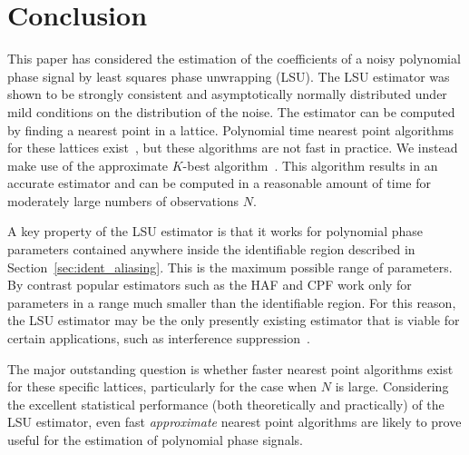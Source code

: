 \documentclass[journal]{IEEEtran}
\begin{document}
\section{Conclusion} \label{sec:conclusion}
 
This paper has considered the estimation of the coefficients of a noisy polynomial phase signal by least squares phase unwrapping (LSU). The LSU estimator was shown to be strongly consistent and asymptotically normally distributed under mild conditions on the distribution of the noise.  The estimator can be computed by finding a nearest point in a lattice. Polynomial time nearest point algorithms for these lattices exist~\cite[Sec 4.3]{McKilliam2010thesis}, but these algorithms are not fast in practice.  We instead make use of the approximate $K$-best algorithm~\cite{Baro_list_sphere_dec_2003,Zhan2006_K_best_sphere_decoder,Mondal_Kbest_again_2009}.  This algorithm results in an accurate estimator and can be computed in a reasonable amount of time for moderately large numbers of observations $N$. 

A key property of the LSU estimator is that it works for polynomial phase parameters contained anywhere inside the identifiable region described in Section~\ref{sec:ident_aliasing}.  This is the maximum possible range of parameters.  By contrast popular estimators such as the HAF and CPF work only for parameters in a range much smaller than the identifiable region.  For this reason, the LSU estimator may be the only presently existing estimator that is viable for certain applications, such as interference suppression~\cite{Djukanovic:2011:PMN:1950994.1951252,Djurovic_aliasing_2012}. 

The major outstanding question is whether faster nearest point algorithms exist for these specific lattices, particularly for the case when $N$ is large.  Considering the excellent statistical performance (both theoretically and practically) of the LSU estimator, even fast \emph{approximate} nearest point algorithms are likely to prove useful for the estimation of polynomial phase signals. 

\nocite{OShea_refiningpps_2010,Amar_low_complex_polyphase_2010}

\appendix
\end{document}
